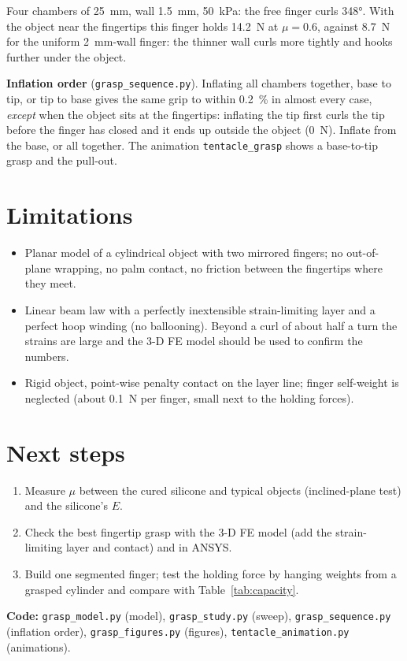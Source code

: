 \documentclass[11pt,a4paper]{article}
\numberwithin{equation}{section}
\begin{document}
Four chambers of \SI{25}{mm}, wall \SI{1.5}{mm}, \SI{50}{kPa}: the free finger curls \ang{348}. With the object near
the fingertips this finger holds \SI{14.2}{N} at $\mu=0.6$, against \SI{8.7}{N} for the uniform \SI{2}{mm}-wall finger:
the thinner wall curls more tightly and hooks further under the object.

\textbf{Inflation order} (\texttt{grasp\_sequence.py}). Inflating all chambers together, base to tip, or tip to base
gives the same grip to within \SI{0.2}{\percent} in almost every case, \emph{except} when the object sits at the
fingertips: inflating the tip first curls the tip before the finger has closed and it ends up outside the object
(\SI{0}{N}). Inflate from the base, or all together. The animation \texttt{tentacle\_grasp} shows a base-to-tip grasp
and the pull-out.

\section{Limitations}
\begin{itemize}[nosep]
\item Planar model of a cylindrical object with two mirrored fingers; no out-of-plane wrapping, no palm contact,
no friction between the fingertips where they meet.
\item Linear beam law with a perfectly inextensible strain-limiting layer and a perfect hoop winding (no
ballooning). Beyond a curl of about half a turn the strains are large and the 3-D FE model should be used to
confirm the numbers.
\item Rigid object, point-wise penalty contact on the layer line; finger self-weight is neglected
(about \SI{0.1}{N} per finger, small next to the holding forces).
\end{itemize}

\section{Next steps}
\begin{enumerate}[nosep]
\item Measure $\mu$ between the cured silicone and typical objects (inclined-plane test) and the silicone's $E$.
\item Check the best fingertip grasp with the 3-D FE model (add the strain-limiting layer and contact) and in ANSYS.
\item Build one segmented finger; test the holding force by hanging weights from a grasped cylinder and compare
with Table~\ref{tab:capacity}.
\end{enumerate}

\textbf{Code:} \texttt{grasp\_model.py} (model), \texttt{grasp\_study.py} (sweep), \texttt{grasp\_sequence.py}
(inflation order), \texttt{grasp\_figures.py} (figures), \texttt{tentacle\_animation.py} (animations).
\end{document}
